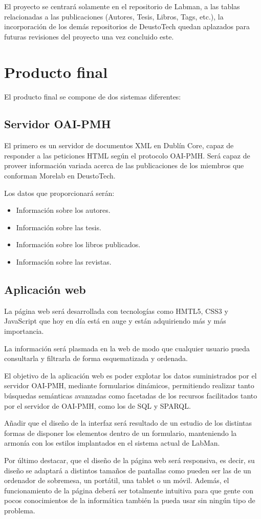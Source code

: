 El proyecto se centrará solamente en el repositorio de Labman, a las tablas relacionadas a las publicaciones (Autores, Tesis, Libros, Tags, etc.), la incorporación de los demás repositorios de DeustoTech quedan aplazados para futuras revisiones del proyecto una vez concluido este.

\chapter{Producto final}

El producto final se compone de dos sistemas diferentes:

\section{Servidor OAI-PMH}

El primero es un servidor de documentos XML en Dublín Core, capaz de responder a las peticiones HTML según el protocolo OAI-PMH. Será capaz de proveer información variada acerca de las publicaciones de los miembros que conforman Morelab en DeustoTech.

Los datos que proporcionará serán:

\begin{itemize}
	\item Información sobre los autores.
	\item Información sobre las tesis.
	\item Información sobre los libros publicados.
	\item Información sobre las revistas.
\end{itemize}

\section{Aplicación web}

La página web será desarrollada con tecnologías como HMTL5, CSS3 y JavaScript que hoy en día está en auge y están adquiriendo más y más importancia.

La información será plasmada en la web de modo que cualquier usuario pueda consultarla y filtrarla de forma esquematizada y ordenada.

El objetivo de la aplicación web es poder explotar los datos suministrados por el servidor OAI-PMH, mediante formularios dinámicos, permitiendo realizar tanto búsquedas semánticas avanzadas como facetadas de los recursos facilitados tanto por el servidor de OAI-PMH, como los de SQL y SPARQL.

Añadir que el diseño de la interfaz será resultado de un estudio de los distintas formas de disponer los elementos dentro de un formulario, manteniendo la armonía con los estilos implantados en el sistema actual de LabMan.

Por último destacar, que el diseño de la página web será responsiva, es decir, su diseño se adaptará a distintos tamaños de pantallas como pueden ser las de un ordenador de sobremesa, un portátil, una tablet o un móvil. Además, el funcionamiento de la página deberá ser totalmente intuitiva para que gente con pocos conocimientos de la informática también la pueda usar sin ningún tipo de problema.